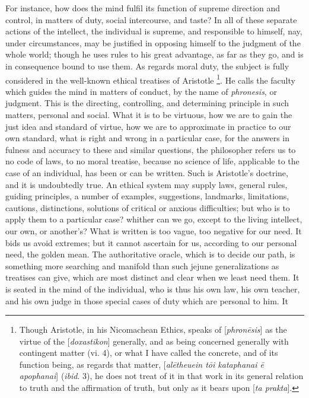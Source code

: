 For instance, how does the mind fulfil its function of supreme
direction and control, in matters of duty, social intercourse, and
taste? In all of these separate actions of the intellect, the
individual is supreme, and responsible to himself, nay, under
circumstances, may be justified in opposing himself to the judgment of
the whole world; though he uses rules to his great advantage, as far
as they go, and is in consequence bound to use them. As regards moral
duty, the subject is fully considered in the well-known ethical
treatises of Aristotle \footnote{Though Aristotle, in his Nicomachean Ethics, speaks of [\emph{phron\={e}sis}]
as the virtue of the [\emph{doxastikon}] generally, and as being
concerned generally with contingent matter (vi. 4), or what I have
called the concrete, and of its function being, as regards that
matter, [\emph{al\={e}theuein t\={o}i kataphanai \={e} apophanai}] (\emph{ibid}.
3), he does not treat of it in that work in its general relation to
truth and the affirmation of truth, but only as it bears upon [\emph{ta
prakta}].}.
He calls the faculty which guides the mind in matters of
conduct, by the name of \emph{phronesis}, or judgment. This is the
directing, controlling, and determining principle in such matters,
personal and social. What it is to be virtuous, how we are to gain the
just idea and standard of virtue, how we are to approximate in
practice to our own standard, what is right and wrong in a particular
case, for the answers in fulness and accuracy to these and similar
questions, the philosopher refers us to no code of laws, to no moral
treatise, because no science of life, applicable to the case of an
individual, has been or can be written. Such is Aristotle's doctrine,
and it is undoubtedly true. An ethical system may supply laws, general
rules, guiding principles, a number of examples, suggestions,
landmarks, limitations, cautions, distinctions, solutions of critical
or anxious difficulties; but who is to apply them to a particular
case? whither can we go, except to the living intellect, our own, or
another's? What is written is too vague, too negative for our need. It
bids us avoid extremes; but it cannot ascertain for us, according to
our personal need, the golden mean. The authoritative oracle, which is
to decide our path, is something more searching and manifold than such
jejune generalizations as treatises can give, which are most distinct
and clear when we least need them. It is seated in the mind of the
individual, who is thus his own law, his own teacher, and his own
judge in those special cases of duty which are personal to him. It
